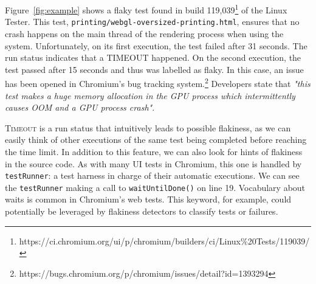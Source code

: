 Figure~\ref{fig:example} shows a flaky test found in build 119,039\footnote{https://ci.chromium.org/ui/p/chromium/builders/ci/Linux\%20Tests/119039/} of the Linux Tester. This test, \texttt{printing/webgl-oversized-printing.html}, ensures that no crash happens on the main thread of the rendering process when using the system. Unfortunately, on its first execution, the test failed after 31 seconds. The run status indicates that a \textsc{TIMEOUT} happened. On the second execution, the test passed after 15 seconds and thus was labelled as flaky. In this case, an issue has been opened in Chromium's bug tracking system.\footnote{https://bugs.chromium.org/p/chromium/issues/detail?id=1393294} Developers state that \textit{"this test makes a huge memory allocation in the GPU process which intermittently causes OOM and a GPU process crash"}.

\textsc{Timeout} is a run status that intuitively leads to possible flakiness, as we can easily think of other executions of the same test being completed before reaching the time limit. In addition to this feature, we can also look for hints of flakiness in the source code. As with many UI tests in Chromium, this one is handled by \texttt{testRunner}: a test harness in charge of their automatic executions. We can see the \texttt{testRunner} making a call to \texttt{waitUntilDone()} on line 19. Vocabulary about waits is common in Chromium's web tests. This keyword, for example, could potentially be leveraged by flakiness detectors to classify tests or failures.




